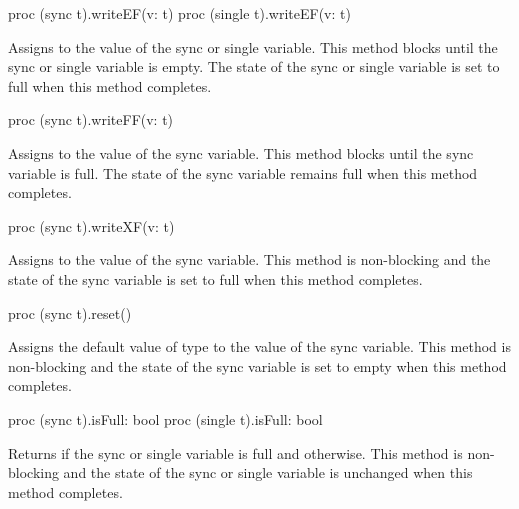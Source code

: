 \begin{protohead}
proc (sync t).writeEF(v: t)
proc (single t).writeEF(v: t)
\end{protohead}
\begin{protobody}
Assigns  to the value of the sync or single variable.  This
method blocks until the sync or single variable is empty.  The state
of the sync or single variable is set to full when this method
completes.
\end{protobody}

\begin{protohead}
proc (sync t).writeFF(v: t)
\end{protohead}
\begin{protobody}
Assigns  to the value of the sync variable.  This method
blocks until the sync variable is full.  The state of the sync
variable remains full when this method completes.
\end{protobody}

\begin{protohead}
proc (sync t).writeXF(v: t)
\end{protohead}
\begin{protobody}
Assigns  to the value of the sync variable.  This method is
non-blocking and the state of the sync variable is set to full when
this method completes.
\end{protobody}

\begin{protohead}
proc (sync t).reset()
\end{protohead}
\begin{protobody}
Assigns the default value of type  to the value of the sync
variable.  This method is non-blocking and the state of the sync
variable is set to empty when this method completes.
\end{protobody}

\begin{protohead}
proc (sync t).isFull: bool
proc (single t).isFull: bool
\end{protohead}
\begin{protobody}
Returns  if the sync or single variable is full and 
otherwise.  This method is non-blocking and the state of the sync or single
variable is unchanged when this method completes.
\end{protobody}

